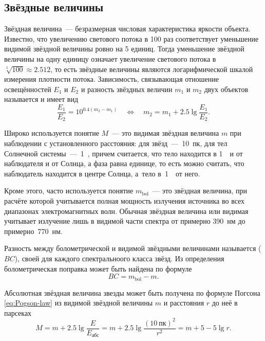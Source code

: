 \subsection{Звёздные величины}

Звёздная величина~--- безразмерная числовая характеристика яркости объекта. Известно, что увеличению светового потока в 100 раз соответствует уменьшение видимой звёздной величины ровно на 5 единиц. Тогда уменьшение звёздной величины на одну единицу означает увеличение светового потока в $\sqrt[5]{100}\approx 2.512$, то есть звёздные величины являются логарифмической шкалой измерения плотности потока. Зависимость, связывающая отношение освещённостей $E_1$ и $E_2$ и разность звёздных величин $m_1$ и $m_2$ двух объектов называется  и имеет вид
\begin{equation}
	\frac{E_1}{E_2} = 10^{0.4(m_2 - m_1)} \quad \Longleftrightarrow \quad m_2 = m_1 + 2.5 \lg \frac{E_1}{E_2}.
	\label{eq:Pogson-law}
\end{equation}

Широко используется понятие  $M$~--- это видимая звёздная величина $m$ при наблюдении с установленного расстояния: для звёзд~---~10~пк, для тел Солнечной системы~---~1~\au, причем считается, что тело находится в 1~\au~и от наблюдателя и от Солнца, а фаза равна единице, то есть можно считать, что наблюдатель находится в центре Солнца, а~тело в~1~\au~от него. 

Кроме этого, часто используется понятие  $m_\text{bol}$~--- это звёздная величина, при расчёте которой учитывается полная мощность излучения источника во всех диапазонах электромагнитных волн. Обычная звёздная величина или видимая учитывает излучение лишь в видимой части спектра от примерно 390~нм до примерно~770~нм.

Разность между болометрической и видимой звёздными величинами называется  ($BC$), своей для каждого спектральноого класса звёзд. Из определения болометрическая поправка может быть найдена по формуле
\begin{equation}
	BC = m_\text{bol} - m.
\end{equation}


Абсолютная звёздная величина звезды может быть получена по формуле Погсона \eqref{eq:Pogson-law} из видимой звёздной величины $m$ и расстояния $r$ до неё в парсеках
\begin{equation}
	M = m + 2.5 \lg \frac{E}{E_\text{абс}} = m + 2.5 \lg \frac{(10~\text{пк})^2}{r^2} = m + 5 - 5\lg r.
\end{equation}